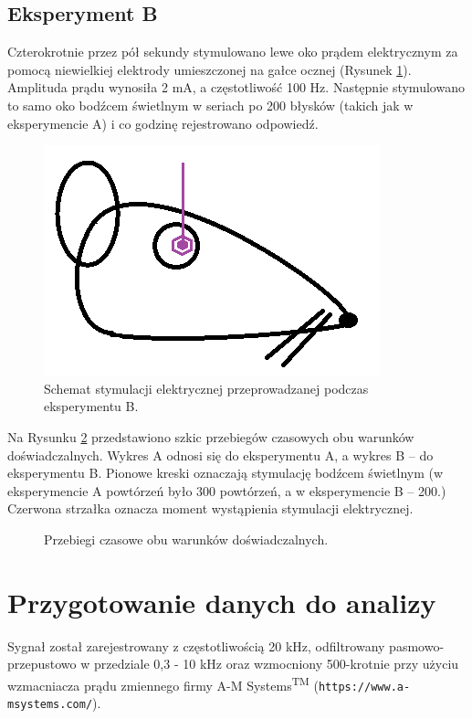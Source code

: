 \documentclass{pracamgr_2}
\begin{document}
\subsection{Eksperyment B}
Czterokrotnie przez pół sekundy stymulowano lewe oko prądem elektrycznym za pomocą niewielkiej elektrody umieszczonej na gałce ocznej (Rysunek \ref{rys:szczurB}). Amplituda prądu wynosiła 2 mA, a częstotliwość 100 Hz. Następnie stymulowano to samo oko bodźcem świetlnym w seriach po 200 błysków (takich jak w eksperymencie A) i co godzinę rejestrowano odpowiedź.
\begin{figure}[htbp]
	\begin{center}
		\includegraphics[scale=0.5]{sty_ele.png}
	\end{center}
	\caption{Schemat stymulacji elektrycznej przeprowadzanej podczas eksperymentu B.}
	\label{rys:szczurB}
\end{figure}
\FloatBarrier
 Na Rysunku \ref{rys:porownanie_paradygmatow} przedstawiono szkic przebiegów czasowych obu warunków doświadczalnych. Wykres A odnosi się do eksperymentu A, a wykres B -- do eksperymentu B. Pionowe kreski oznaczają stymulację bodźcem świetlnym (w eksperymencie A powtórzeń było 300 powtórzeń, a w eksperymencie B -- 200.) Czerwona strzałka oznacza moment wystąpienia stymulacji elektrycznej.
\begin{figure}
	
	\caption{Przebiegi czasowe obu warunków doświadczalnych.}
	\label{rys:porownanie_paradygmatow}
\end{figure}
\section{Przygotowanie danych do analizy}
Sygnał został zarejestrowany z częstotliwością 20 kHz, odfiltrowany pasmowo-przepustowo w przedziale 0,3 - 10 kHz oraz wzmocniony 500-krotnie przy użyciu wzmacniacza prądu zmiennego firmy A-M Systems\textsuperscript{TM} (\texttt{https://www.a-msystems.com/}).
\end{document}
